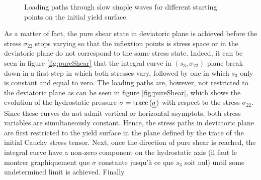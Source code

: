 \begin{figure}[h!]
  \centering
  \caption{Loading paths through slow simple waves for different starting points on the initial yield surface.}
  \label{fig:slow_path_plane_strains}
\end{figure}

As a matter of fact, the pure shear state in deviatoric plane is achieved before the stress $\sigma_{22}$ stops varying so that the inflextion points is stress space or in the deviatoric plane do not correspond to the same stress state.
Indeed, it can be seen in figure \ref{fig:pureShear} that the integral curve in $(s_3,\sigma_{22})$ plane break down in a first step in which both stresses vary, followed by one in which $s_3$ only is constant and equal to zero.
The loading paths are, however, not restricted to the deviatoric plane as can be seen in figure \ref{fig:pureShear}, which shows the evolution of the hydrostatic pressure $\sigma = \operatorname{trace \,}({\underline{\underline{\sigma}}})$ with respect to the stress $\sigma_{22}$.
Since these curves do not admit vertical or horizontal asymptots, both stress variables are simultaneously constant.
Hence, the stress paths in deviatoric plane are first restricted to the yield surface in the plane defined by the trace of the initial Cauchy stress tensor.
Next, once the direction of pure shear is reached, the integral curve have a non-zero component on the hydrostatic axis (il faut le montrer graphiquement que $\sigma$ constante jusqu'à ce que $s_3$ soit nul) until some undetermined limit is achieved.
Finally

